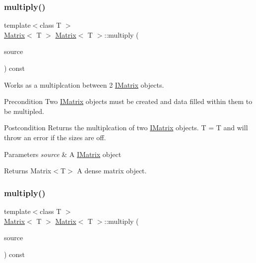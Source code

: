 \subsubsection{\texorpdfstring{multiply()}{multiply()}\hspace{0.1cm}{\footnotesize\ttfamily [3/6]}}
{\footnotesize\ttfamily template$<$class T $>$ \\
\mbox{\hyperlink{class_matrix}{Matrix}}$<$ T $>$ \mbox{\hyperlink{class_matrix}{Matrix}}$<$ T $>$\+::multiply (\begin{DoxyParamCaption}\item[{const \mbox{\hyperlink{class_i_matrix}{I\+Matrix}}$<$ \mbox{\hyperlink{class_l_matrix}{L\+Matrix}}$<$ T $>$, T $>$ \&}]{source }\end{DoxyParamCaption}) const}



Works as a multiplcation between 2 \mbox{\hyperlink{class_i_matrix}{I\+Matrix}} objects. 

\begin{DoxyPrecond}{Precondition}
Two \mbox{\hyperlink{class_i_matrix}{I\+Matrix}} objects must be created and data filled within them to be multipled. 
\end{DoxyPrecond}
\begin{DoxyPostcond}{Postcondition}
Returns the multiplcation of two \mbox{\hyperlink{class_i_matrix}{I\+Matrix}} objects. T = T and will throw an error if the sizes are off.
\end{DoxyPostcond}

\begin{DoxyParams}{Parameters}
{\em source} & A \mbox{\hyperlink{class_i_matrix}{I\+Matrix}} object \\
\hline
\end{DoxyParams}
\begin{DoxyReturn}{Returns}
Matrix$<$\+T$>$ A dense matrix object. 
\end{DoxyReturn}
\mbox{\label{class_matrix_a610817669271826873968ccaa3ac92e7}} 
\subsubsection{\texorpdfstring{multiply()}{multiply()}\hspace{0.1cm}{\footnotesize\ttfamily [4/6]}}
{\footnotesize\ttfamily template$<$class T $>$ \\
\mbox{\hyperlink{class_matrix}{Matrix}}$<$ T $>$ \mbox{\hyperlink{class_matrix}{Matrix}}$<$ T $>$\+::multiply (\begin{DoxyParamCaption}\item[{const \mbox{\hyperlink{class_i_matrix}{I\+Matrix}}$<$ \mbox{\hyperlink{class_u_matrix}{U\+Matrix}}$<$ T $>$, T $>$ \&}]{source }\end{DoxyParamCaption}) const}



